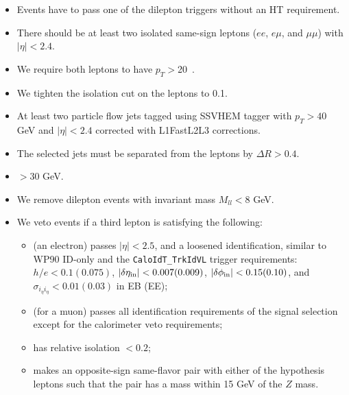 \begin{itemize}
	\item Events have to pass one of the dilepton triggers without an HT requirement.
	\item There should be at least two isolated same-sign leptons ($ee$, $e\mu$, and $\mu\mu$) with $|\eta| < 2.4$.
	\item We require both leptons to have $p_T>$20~\GeV.
	\item We tighten the isolation cut on the leptons to 0.1.
	\item At least two particle flow jets tagged using SSVHEM tagger with $p_T > 40$ GeV and $|\eta| < 2.4$
		corrected with L1FastL2L3 corrections.
	\item The selected jets must be separated from the leptons by $\Delta R > 0.4$.
	\item \met $> 30$ GeV.
	\item We remove dilepton events with invariant mass $M_{ll} < 8$ GeV.
	\item We veto events if a third lepton is satisfying the following:
	\begin{itemize}
		\item (an electron)  passes  $|\eta|<2.5$, and a loosened identification, 
			similar to WP90 ID-only and the {\tt CaloIdT\_TrkIdVL} trigger requirements: 
			$h/e< 0.1 (0.075)$, $|\delta \eta_{\rm in}|<0.007 (0.009)$, $|\delta\phi_{\rm in}|< 0.15 (0.10)$, and $\sigma_{i_\eta i_\eta}<0.01 (0.03)$
			in EB (EE);
		\item (for a muon) passes all identification requirements of the signal selection except for the calorimeter veto requirements;
		\item has relative isolation $<0.2$; 
		\item makes an opposite-sign same-flavor pair with either of the hypothesis leptons such that the pair has a mass within 15 GeV of the $Z$ mass.
	\end{itemize}
\end{itemize}


